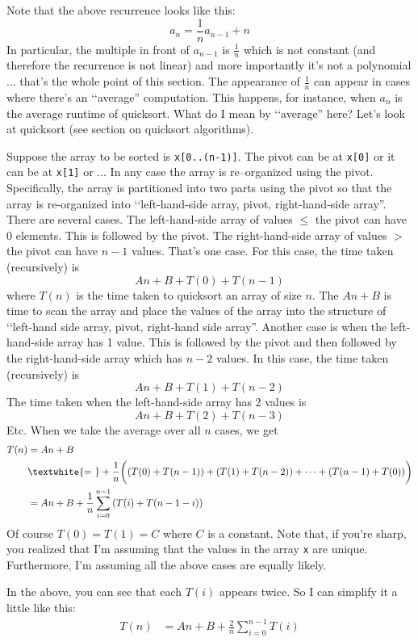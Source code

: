 \newpage
\begin{ex}
Note that the above recurrence looks like this:
\[
a_n = \frac{1}{n} a_{n-1} + n
\]
In particular, the multiple in front of $a_{n-1}$ is $\frac{1}{n}$
which is not constant (and therefore the recurrence is
not linear) and more importantly it's not a polynomial ...
that's the whole point of this section.
The appearance of $\frac{1}{n}$ can appear in cases where
there's an \lq\lq average'' computation.
This happens, for instance,
when $a_n$ is the average runtime of quicksort.
What do I mean by \lq\lq average'' here?
Let's look at quicksort (see section on quicksort algorithms).

Suppose the array to be sorted is \verb!x[0..(n-1)]!.
The pivot can be at \verb!x[0]! or it can be at \verb!x[1]! or ...
In any case the array is re--organized using the pivot.
Specifically,
the array is partitioned into two parts using the pivot
so that the array is re-organized into
\lq\lq left-hand-side array, pivot, right-hand-side array''.
There are several cases.
The left-hand-side array of values $\leq$ the pivot can have 0 elements.
This is followed by the pivot.
The right-hand-side array of values $>$ the pivot can have $n - 1$ values.
That's one case.
For this case, the time taken (recursively) is
\[
An + B + T(0) + T(n - 1)
\]
where $T(n)$ is the time taken to quicksort an array of size $n$.
The $An + B$ is time to scan the array
and place the values of the array into the structure
of 
\lq\lq left-hand side array, pivot, right-hand side array''.
Another case is when the left-hand-side array has 1 value.
This is followed by the pivot and then followed by the right-hand-side
array which has $n - 2$ values.
In this case, the time taken (recursively) is
\[
An + B + T(1) + T(n - 2)
\]
The time taken when the left-hand-side array has 2 values is
\[
An + B + T(2) + T(n - 3)
\]
Etc.
When we take the average over all $n$ cases, we get
\begin{align*}
T(n)
&= An + B \\
&\textwhite{= \ }
+ \frac{1}{n} 
\biggl(
  \left( T(0) + T(n-1) \right)
  + \left( T(1) + T(n-2) \right)
  + \cdots
  + \left( T(n - 1) + T(0) \right)
\biggr) \\
&= An + B + \frac{1}{n}\sum_{i=0}^{n-1} \left( T(i) + T(n - 1 - i) \right)
\end{align*}
Of course $T(0) = T(1) = C$ where $C$ is a constant.
Note that, if you're sharp, you realized that I'm assuming that the
values in the array \verb!x! are unique.
Furthermore, I'm assuming all the above cases are equally likely.

In the above, you can see that each $T(i)$ appears twice.
So I can simplify it a little like this:
\begin{align*}
T(n)
&= An + B + \frac{2}{n}\sum_{i=0}^{n-1} T(i)
\end{align*}
\end{ex}

